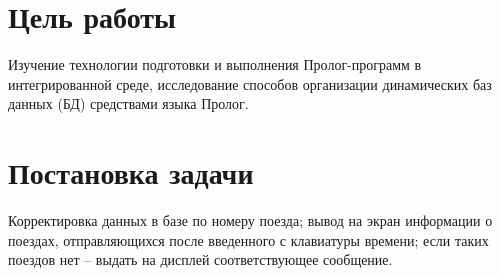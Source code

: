 \documentclass[a4paper,14pt]{extarticle}
\begin{document}


\section{Цель работы}
Изучение технологии подготовки и выполнения Пролог-программ в интегрированной
среде, исследование способов организации динамических баз данных (БД) средствами
языка Пролог.

\section{Постановка задачи}
Корректировка данных в базе по номеру поезда; вывод на экран информации о
поездах, отправляющихся после введенного с клавиатуры времени; если таких
поездов нет -- выдать на дисплей соответствующее сообщение.
\end{document}

